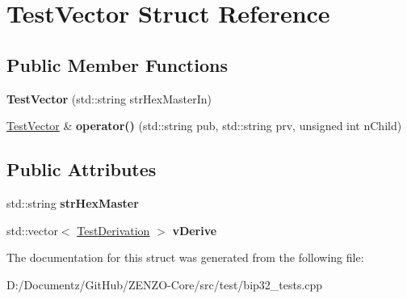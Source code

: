 \hypertarget{struct_test_vector}{}\section{Test\+Vector Struct Reference}
\label{struct_test_vector}
\subsection*{Public Member Functions}
\begin{DoxyCompactItemize}
\item 
\mbox{\label{struct_test_vector_a8df968a52aeec4bb196f25df26149880}} 
{\bfseries Test\+Vector} (std\+::string str\+Hex\+Master\+In)
\item 
\mbox{\label{struct_test_vector_a1542d97f320ee7e20df20ae892ca96be}} 
\mbox{\hyperlink{struct_test_vector}{Test\+Vector}} \& {\bfseries operator()} (std\+::string pub, std\+::string prv, unsigned int n\+Child)
\end{DoxyCompactItemize}
\subsection*{Public Attributes}
\begin{DoxyCompactItemize}
\item 
\mbox{\label{struct_test_vector_ae502ac11e16c7043c21010744629ae8a}} 
std\+::string {\bfseries str\+Hex\+Master}
\item 
\mbox{\label{struct_test_vector_ae64e3057c473c2e09536be8efc2d8cdf}} 
std\+::vector$<$ \mbox{\hyperlink{struct_test_derivation}{Test\+Derivation}} $>$ {\bfseries v\+Derive}
\end{DoxyCompactItemize}


The documentation for this struct was generated from the following file\+:\begin{DoxyCompactItemize}
\item 
D\+:/\+Documentz/\+Git\+Hub/\+Z\+E\+N\+Z\+O-\/\+Core/src/test/bip32\+\_\+tests.\+cpp\end{DoxyCompactItemize}
